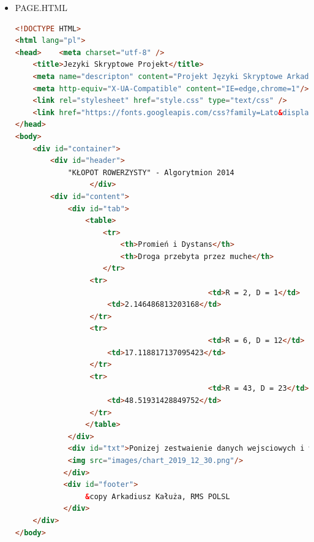 \documentclass[12pt,a4paper]{article}
\begin{document}
\begin{itemize}
\begin{lstlisting}[language=Python]
while (i != len(tab) and j!=len(output)):
    html.write('                 <tr>\n                     '
               '                       <td>')
    html.write(newTab[i].replace('\n', ''))
    html.write('</td>\n                     <td>')
    html.write(output[j].replace('\n', ''))
    html.write('</td> \n                 </tr>\n')
    i += 1
    j += 1

html.write('                </table>\n'
           '            </div>\n'
           '            <div id="txt">Ponizej zestwaienie danych wejsciowych i wyjsciowych </div> \n'
           '            <img src="images/chart_' + d1 + '.png"/>\n'
           '           </div> \n'
           '           <div id="footer"> \n'
           '                &copy Arkadiusz Kałuża, RMS POLSL \n'
           '           </div> \n'
           '    </div> \n'
           '</body> \n')
html.close()

	\end{lstlisting}
	
	\item PAGE.HTML
	\begin{lstlisting}[language=Html]
<!DOCTYPE HTML>
<html lang="pl">
<head>    <meta charset="utf-8" />
    <title>Jezyki Skryptowe Projekt</title>
    <meta name="descripton" content="Projekt Języki Skryptowe Arkadiusz Kałuża"/>
    <meta http-equiv="X-UA-Compatible" content="IE=edge,chrome=1"/> 
    <link rel="stylesheet" href="style.css" type="text/css" /> 
    <link href="https://fonts.googleapis.com/css?family=Lato&display=swap" rel="stylesheet"> 
</head> 
<body> 
    <div id="container"> 
        <div id="header"> 
            "KŁOPOT ROWERZYSTY" - Algorytmion 2014 
                 </div> 
        <div id="content"> 
            <div id="tab">
                <table>
                    <tr>
                        <th>Promień i Dystans</th>
                        <th>Droga przebyta przez muche</th>
                    </tr>
                 <tr>
                                            <td>R = 2, D = 1</td>
                     <td>2.146486813203168</td> 
                 </tr>
                 <tr>
                                            <td>R = 6, D = 12</td>
                     <td>17.118817137095423</td> 
                 </tr>
                 <tr>
                                            <td>R = 43, D = 23</td>
                     <td>48.51931428849752</td> 
                 </tr>
                </table>
            </div>
            <div id="txt">Ponizej zestwaienie danych wejsciowych i wyjsciowych </div> 
            <img src="images/chart_2019_12_30.png"/>
           </div> 
           <div id="footer"> 
                &copy Arkadiusz Kałuża, RMS POLSL 
           </div> 
    </div> 
</body> 
	\end{lstlisting}
	

\end{itemize}
\end{document}
